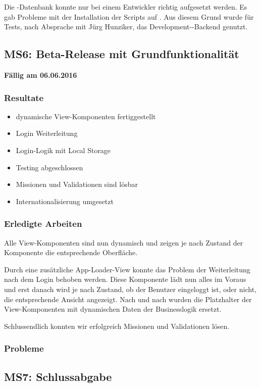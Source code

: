 Die \kort{}-Datenbank konnte nur bei einem Entwickler richtig aufgesetzt werden. 
Es gab Probleme mit der Installation der Scripts auf .
Aus diesem Grund wurde für Tests, nach Absprache mit Jürg Hunziker, das Development-\kort{}-Backend genutzt.

\subsection{MS6: Beta-Release mit Grundfunktionalität}
\label{pm-ms6}
\textbf{Fällig am 06.06.2016}
\subsubsection{Resultate}
\begin{itemize}
	\item dynamische View-Komponenten fertiggestellt
	\item Login Weiterleitung
	\item Login-Logik mit Local Storage
	\item Testing abgeschlossen
	\item Missionen und Validationen sind lösbar
	\item Internationalisierung umgesetzt
\end{itemize}

\subsubsection{Erledigte Arbeiten}
Alle View-Komponenten sind nun dynamisch und zeigen je nach Zustand der Komponente die entsprechende Oberfläche.

Durch eine zusätzliche App-Loader-View konnte das Problem der Weiterleitung nach dem Login behoben werden.
Diese Komponente lädt nun alles im Voraus und erst danach wird je nach Zustand, ob der Benutzer eingeloggt ist, oder nicht, die entsprechende Ansicht angezeigt.
Nach und nach wurden die Platzhalter der View-Komponenten mit dynamischen Daten der Businesslogik ersetzt.

Schlussendlich konnten wir erfolgreich Missionen und Validationen lösen.


\subsubsection{Probleme}


\subsection{MS7: Schlussabgabe}
\label{pm-ms7}

